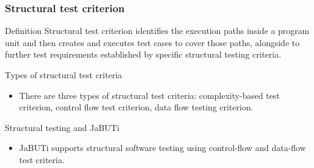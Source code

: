 \begin{frame}[parent={cmap:structural-software-testing},hasnext=true,hasprev=true]
\frametitle{Structural test criterion}
\label{concept:structural-test-criterion}

\begin{block:concept}{Definition}
Structural test criterion identifies the execution paths inside a
program unit and then creates and executes test cases to cover those
paths, alongside to further test requirements established by specific
structural testing criteria.
\end{block:concept}


\begin{block:fact}{Types of structural test criteria}
\begin{itemize}
	\item There are three types of structural test criteria: complexity-based
	test criterion, control flow test criterion, data flow testing criterion.
\end{itemize}
\end{block:fact}

\begin{block:fact}{Structural testing and JaBUTi}
\begin{itemize}
	\item JaBUTi supports structural software testing using control-flow and
	data-flow test criteria.
\end{itemize}
\end{block:fact}
\end{frame}